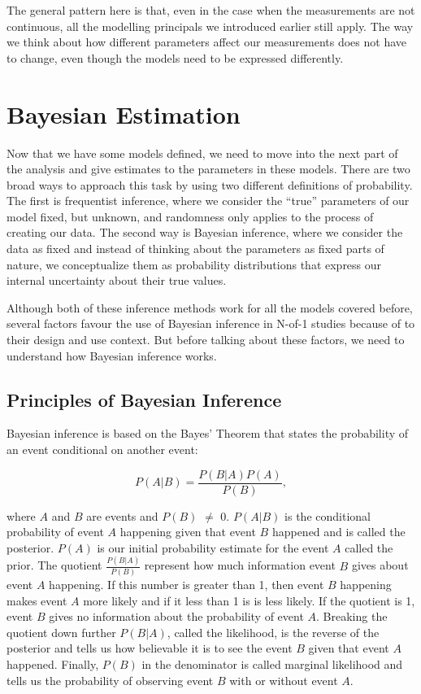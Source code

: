 \documentclass[12pt,a4paper,leqno]{report}
\theoremstyle{plain}
\theoremstyle{definition}
\theoremstyle{remark}
\begin{document}
The general pattern here is that, even in the case when the measurements are not
continuous, all the modelling principals we introduced earlier still apply. The way we
think about how different parameters affect our measurements does not have to change,
even though the models need to be expressed differently.

\chapter{Bayesian Estimation}\label{bayes}

Now that we have some models defined, we need to move into the next part of the
analysis and give estimates to the parameters in these models. There
are two broad ways to approach this task by using two different definitions of
probability. The first is frequentist inference, where we consider the ``true''
parameters of our model fixed, but unknown, and randomness only applies to the
process of creating our data. The second way is Bayesian inference, where we
consider the data as fixed and instead of thinking about the parameters as
fixed parts of nature, we conceptualize them as probability distributions that
express our internal uncertainty about their true values.

Although both of these inference methods work for all the models covered before,
several factors favour the use of Bayesian inference in N-of-1
studies because of to their design and use context. But before talking about these factors,
we need to understand how Bayesian inference works.

\section{Principles of Bayesian Inference}\label{whybayes}

Bayesian inference is based on the Bayes' Theorem that states the probability of
an event conditional on another event:

\begin{def}\label{}
    \begin{equation}\label{bayesrule}
        P(A|B) = \frac{P(B|A)P(A)}{P(B)},
    \end{equation}
\end{def}where \(A\) and \(B\) are events and \(P(B)\) \(\neq \) 0. \(P(A|B)\) is the conditional probability of event \(A\) happening given that
event \(B\) happened and is called the posterior. \(P(A)\) is our initial
probability estimate for the event \(A\) called the prior. The quotient
\(\frac{P(B|A)}{P(B)}\) represent how much information event \(B\) gives about
event \(A\) happening. If this number is greater than 1, then event \(B\)
happening makes event \(A\) more likely and if it less than 1 is is less likely.
If the quotient is 1, event \(B\) gives no information about the probability of
event \(A\). Breaking the quotient down further \(P(B|A)\), called the likelihood, is the reverse of the posterior and tells us how believable it is to
see the event \(B\) given that event \(A\) happened. Finally, \(P(B)\) in the denominator is called marginal likelihood and tells us the probability of
observing event \(B\) with or without event \(A\).
\end{document}
